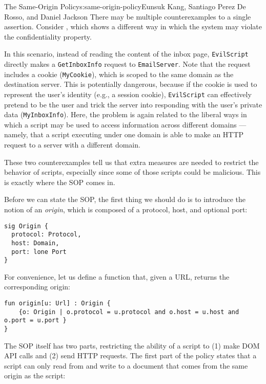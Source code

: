 \begin{aosachapter}{The Same-Origin Policy}{s:same-origin-policy}{Eunsuk Kang, Santiago Perez De Rosso, and Daniel Jackson}
There may be multiple counterexamples to a single assertion. Consider
, which shows a
different way in which the system may violate the confidentiality
property.


In this scenario, instead of reading the content of the inbox page,
\texttt{EvilScript} directly makes a \texttt{GetInboxInfo} request to
\texttt{EmailServer}. Note that the request includes a cookie
(\texttt{MyCookie}), which is scoped to the same domain as the
destination server. This is potentially dangerous, because if the cookie
is used to represent the user's identity (e.g., a session cookie),
\texttt{EvilScript} can effectively pretend to be the user and trick the
server into responding with the user's private data
(\texttt{MyInboxInfo}). Here, the problem is again related to the
liberal ways in which a script may be used to access information across
different domains --- namely, that a script executing under one domain
is able to make an HTTP request to a server with a different domain.

These two counterexamples tell us that extra measures are needed to
restrict the behavior of scripts, especially since some of those scripts
could be malicious. This is exactly where the SOP comes in.

\label{same-origin-policy}

Before we can state the SOP, the first thing we should do is to
introduce the notion of an \emph{origin}, which is composed of a
protocol, host, and optional port:

\begin{verbatim}
sig Origin {
  protocol: Protocol,
  host: Domain,
  port: lone Port
}
\end{verbatim}

For convenience, let us define a function that, given a URL, returns the
corresponding origin:

\begin{verbatim}
fun origin[u: Url] : Origin {
    {o: Origin | o.protocol = u.protocol and o.host = u.host and o.port = u.port }
}
\end{verbatim}

The SOP itself has two parts, restricting the ability of a script to (1)
make DOM API calls and (2) send HTTP requests. The first part of the
policy states that a script can only read from and write to a document
that comes from the same origin as the script:


\end{aosachapter}
